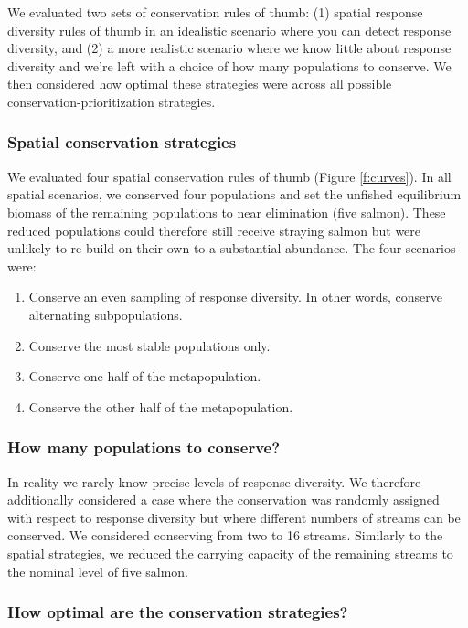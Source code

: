 We evaluated two sets of conservation rules of thumb: (1) spatial
response diversity rules of thumb in an idealistic scenario where you
can detect response diversity, and (2) a more realistic scenario where
we know little about response diversity and we're left with a choice of
how many populations to conserve. We then considered how optimal these
strategies were across all possible conservation-prioritization
strategies.

\subsubsection{Spatial conservation strategies}

We evaluated four spatial conservation rules of thumb (Figure
\ref{f:curves}). In all spatial scenarios, we conserved four populations
and set the unfished equilibrium biomass of the remaining populations to
near elimination (five salmon). These reduced populations could
therefore still receive straying salmon but were unlikely to re-build on
their own to a substantial abundance. The four scenarios were:

\begin{enumerate}
\def\labelenumi{\arabic{enumi}.}
\itemsep1pt\parskip0pt
\item
  Conserve an even sampling of response diversity. In other words,
  conserve alternating subpopulations.
\item
  Conserve the most stable populations only.
\item
  Conserve one half of the metapopulation.
\item
  Conserve the other half of the metapopulation.
\end{enumerate}

\subsubsection{How many populations to conserve?}

In reality we rarely know precise levels of response diversity. We
therefore additionally considered a case where the conservation was
randomly assigned with respect to response diversity but where different
numbers of streams can be conserved. We considered conserving from two
to 16 streams. Similarly to the spatial strategies, we reduced the
carrying capacity of the remaining streams to the nominal level of five
salmon.

\subsubsection{How optimal are the conservation strategies?}

